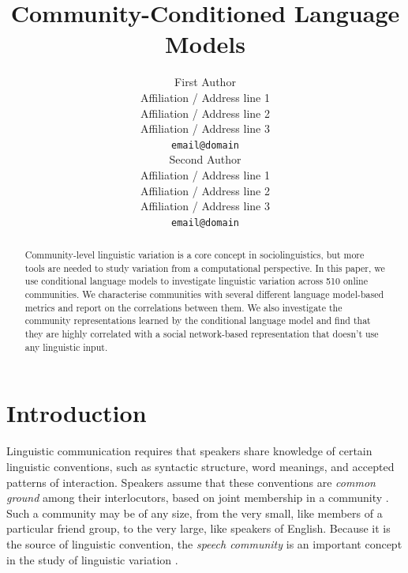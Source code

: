 \documentclass[11pt]{article}
\title{Community-Conditioned Language Models}
\author{First Author \\
  Affiliation / Address line 1 \\
  Affiliation / Address line 2 \\
  Affiliation / Address line 3 \\
  \texttt{email@domain} \\\And
  Second Author \\
  Affiliation / Address line 1 \\
  Affiliation / Address line 2 \\
  Affiliation / Address line 3 \\
  \texttt{email@domain} \\}
\date{}
\begin{document}
\maketitle
\begin{abstract}
  Community-level linguistic variation is a core concept in sociolinguistics,
  but more tools are needed to study variation from a computational perspective.
  In this paper, we use conditional language models to investigate linguistic variation
  across 510 online communities.
  We characterise communities with several different language model-based metrics
  and report on the correlations between them. 
  We also investigate the community representations learned by the conditional language model
  and find that they are highly correlated with a social network-based 
  representation that doesn't use any linguistic input.
\end{abstract}








\section{Introduction}
Linguistic communication requires that speakers share
knowledge of certain linguistic conventions, such as syntactic
structure, word meanings, and accepted patterns of interaction.
Speakers assume that these conventions are \emph{common ground} among
their interlocutors, based on joint membership in a community
\cite{Stalnaker2002, Clark1996}.  Such a community may be of any size,
from the very small, like members of a particular friend group, to the
very large, like speakers of English.  Because it is the source of
linguistic convention, the \emph{speech community} is an important
concept in the study of linguistic variation \citep{Gumperz1972}.
\end{document}
